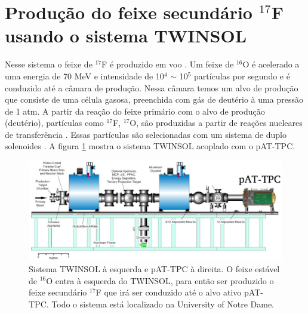 \documentclass[a4paper,12pt,oneside]{book}
\begin{document}
\section{Produção do feixe secundário $^{17}$F usando o sistema TWINSOL}\label{sec:twinsol}

\par Nesse sistema o feixe de $^{17}$F é produzido em voo \cite{KOLATA1989503, NDtandem}. Um feixe de $^{16}$O é acelerado a uma energia de 70 MeV e intensidade de 10$^4$ $\sim$ 10$^5$ partículas por segundo e é conduzido até a câmara de produção. Nessa câmara temos um alvo de produção que consiste de uma célula gasosa, preenchida com gás de deutério à uma pressão de 1 atm. A partir da reação do feixe primário com o alvo de produção (deutério), partículas como $^{17}$F, $^{17}$O, são produzidas a partir de reações nucleares de transferência \cite{KOLATA1989503, twinsol}. Essas partículas são selecionadas com um sistema de duplo solenoides \cite{twinsol, ribras_leo}. A figura \ref{fig:twinsol+pattpc} mostra o sistema TWINSOL acoplado com o pAT-TPC.


\begin{figure}[H]
    \centering
    \includegraphics[scale = 0.35]{figs/poster3.jpeg}
    \caption{Sistema TWINSOL à esquerda e pAT-TPC à direita. O feixe estável de $^{16}$O entra à esquerda do TWINSOL, para então ser produzido o feixe secundário $^{17}$F que irá ser conduzido até o alvo ativo pAT-TPC. Todo o sistema está localizado na University of Notre Dame.}
    \label{fig:twinsol+pattpc}
\end{figure}
\end{document}
